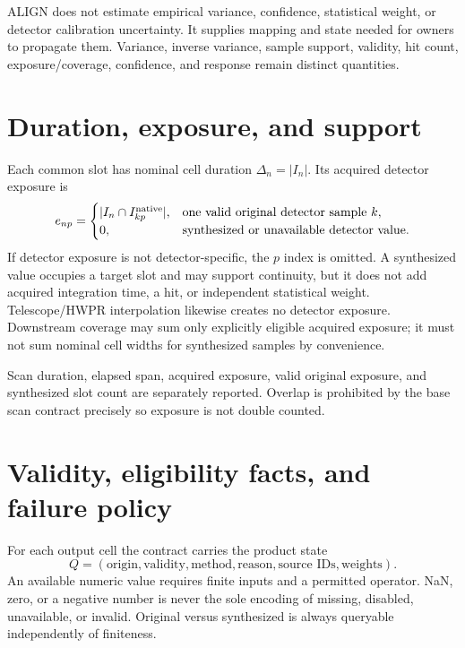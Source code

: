 \documentclass[11pt]{article}
\begin{document}
ALIGN does not estimate empirical variance, confidence, statistical weight,
or detector calibration uncertainty.  It supplies mapping and state needed
for owners to propagate them.  Variance, inverse variance, sample support,
validity, hit count, exposure/coverage, confidence, and response remain
distinct quantities.

\section{Duration, exposure, and support}

Each common slot has nominal cell duration
\(\Delta_n=|I_n|\).  Its acquired detector exposure is
\begin{equation}
 e_{np}=\begin{cases}
 |I_n\cap I^{\rm native}_{kp}|,&\text{one valid original detector sample }k,\\
 0,&\text{synthesized or unavailable detector value.}
 \end{cases}
 \label{eq:exposure}
\end{equation}
If detector exposure is not detector-specific, the \(p\) index is omitted.
A synthesized value occupies a target slot and may support continuity, but it
does not add acquired integration time, a hit, or independent statistical
weight.  Telescope/HWPR interpolation likewise creates no detector exposure.
Downstream coverage may sum only explicitly eligible acquired exposure; it
must not sum nominal cell widths for synthesized samples by convenience.

Scan duration, elapsed span, acquired exposure, valid original exposure, and
synthesized slot count are separately reported.  Overlap is prohibited by the
base scan contract precisely so exposure is not double counted.

\section{Validity, eligibility facts, and failure policy}

For each output cell the contract carries the product state
\begin{equation}
 Q=(\text{origin},\text{validity},\text{method},\text{reason},
 \text{source IDs},\text{weights}).
 \label{eq:quality}
\end{equation}
An available numeric value requires finite inputs and a permitted operator.
NaN, zero, or a negative number is never the sole encoding of missing,
disabled, unavailable, or invalid.  Original versus synthesized is always
queryable independently of finiteness.
\end{document}
